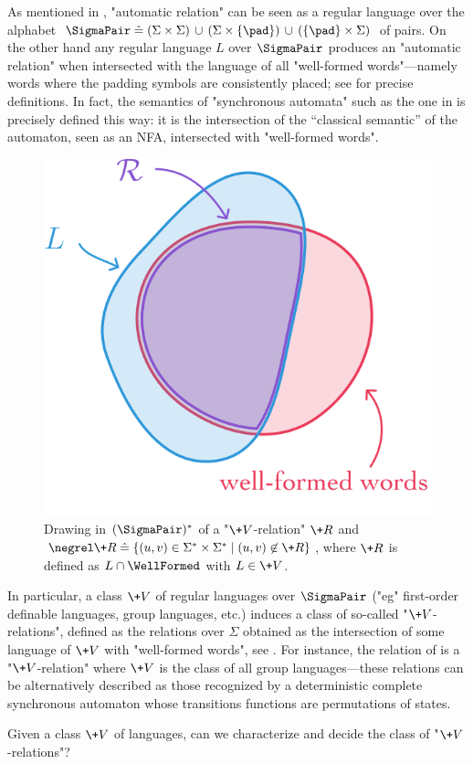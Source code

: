 As mentioned in ,
"automatic relation" can be seen as a regular language over the alphabet
$\SigmaPair \defeq (\Sigma \times \Sigma) \,\cup\,
(\Sigma \times \{\pad\}) \,\cup\, (\{\pad\} \times \Sigma)$ of pairs. On the other hand any regular language $L$ over $\SigmaPair$
produces an "automatic relation" when intersected with the language of all
"well-formed words"---namely words where the padding symbols are consistently placed;
see  for precise definitions. In fact, the semantics
of "synchronous automata" such as the one in  is precisely defined this way:
it is the intersection of the ``classical semantic'' of the automaton, seen as an NFA, intersected
with "well-formed words".

\begin{figure}[htbp]
	\begin{center}
		\includegraphics[width=.4\linewidth]{fig/algebra/projection.png}
	\end{center}
	\caption{
		\AP\label{fig:projection}
		Drawing in $(\SigmaPair)^*$ of a "$\+V$-relation" $\+R$ and $\negrel\+R \defeq \{(u,v) \in \Sigma^*\times \Sigma^* \mid (u,v) \not\in \+R\}$, where $\+R$ is defined as $L \cap \WellFormed$ with $L \in \+V$.
	} 
\end{figure}

In particular, a class $\+V$ of regular languages over
$\SigmaPair$
("eg" first-order definable languages, group languages, etc.) induces a class of so-called
"$\+V$-relations", defined as the relations over $\Sigma$ obtained as the intersection of some 
language of $\+V$ with "well-formed words", see .
For instance, the relation of 
is a "$\+V$-relation" where $\+V$ is the class of all group languages---these relations can be 
alternatively described as those recognized by a deterministic complete synchronous automaton whose 
transitions functions are permutations of states.

\begin{question}
	\AP\label{quest:V-relations}
	Given a class $\+V$ of languages, can we characterize and decide the class of "$\+V$-relations"?
\end{question}

